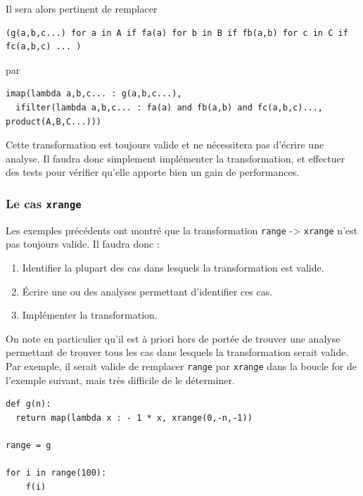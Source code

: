 \documentclass[a4paper]{article}
\begin{document}
Il sera alors pertinent de remplacer

\begin{lstlisting}
(g(a,b,c...) for a in A if fa(a) for b in B if fb(a,b) for c in C if fc(a,b,c) ... )
\end{lstlisting}
 
par

\begin{lstlisting}
imap(lambda a,b,c... : g(a,b,c...), 
  ifilter(lambda a,b,c... : fa(a) and fb(a,b) and fc(a,b,c)..., product(A,B,C...)))
\end{lstlisting}

Cette transformation est toujours valide et ne nécessitera pas
d'écrire une analyse. Il faudra donc simplement implémenter la
transformation, et effectuer des tests pour vérifier qu'elle apporte
bien un gain de performances.

\subsubsection{Le cas \texttt{xrange}}


Les exemples précédents ont montré que la transformation \texttt{range} ->
 \texttt{xrange} n'est pas toujours valide. Il faudra donc :

\begin{enumerate}
\item Identifier la plupart des cas dans lesquels la transformation
  est valide.
\item Écrire une ou des analyses permettant d'identifier ces cas.
\item Implémenter la transformation.
\end{enumerate}

On note en particulier qu'il est à priori hors de portée de trouver
une analyse permettant de trouver tous les cas dans lesquels la
transformation serait valide. Par exemple, il serait valide de
remplacer \texttt{range} par \texttt{xrange} dans la boucle for de l'exemple suivant,
mais très difficile de le déterminer.


\begin{lstlisting}
def g(n):
  return map(lambda x : - 1 * x, xrange(0,-n,-1))

range = g

for i in range(100):
    f(i)
\end{lstlisting}
\end{document}
